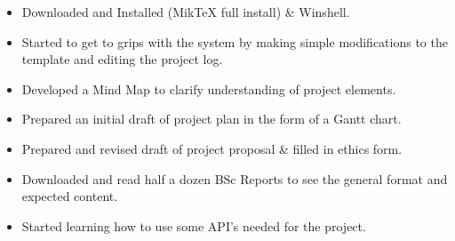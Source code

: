 \begin{itemize}
  \item Downloaded and Installed \latex (MikTeX full install) \& Winshell. 
  \item Started to get to grips with the \latex system by making simple modifications to the template and editing the project log.
  \item Developed a Mind Map to clarify understanding of project elements.
  \item Prepared an initial draft of project plan in the form of a Gantt chart. 
  \item Prepared and revised draft of project proposal \& filled in ethics form. 
  \item Downloaded and read half a dozen BSc Reports to see the general format and expected content.
  \item Started learning how to use some API's needed for the project. 
\end{itemize}



